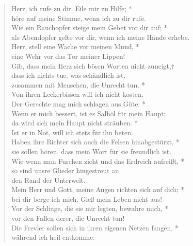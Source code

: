 \def\greinitialformat#1{{\fontsize{40}{40}\selectfont #1}}
\gresetfirstlineaboveinitial{\small \textcolor{red}{Ps 140(141)}}{}
\setaboveinitialseparation{0.72mm}


\vspace{0.3cm}

\begin{verse}
 Herr, ich rufe zu dir. Eile mir zu Hilfe; *\\
höre auf meine Stimme, wenn ich zu dir rufe.\\ \vin 
Wie ein Rauchopfer steige mein Gebet vor dir auf; *\\ \vin 
als Abendopfer gelte vor dir, wenn ich meine Hände erhebe.\\ 
Herr, stell eine Wache vor meinen Mund, *\\
eine Wehr vor das Tor meiner Lippen! \\ \vin 
Gib, dass mein Herz sich bösen Worten nicht zuneigt,†\\ \vin 
dass ich nichts tue, was schändlich ist, \\ \vin zusammen mit Menschen, die Unrecht tun. *\\ \vin  Von ihren Leckerbissen will ich nicht kosten.\\
Der Gerechte mag mich schlagen aus Güte: *\\
Wenn er mich bessert, ist es Salböl für mein Haupt; \\ \vin 
da wird sich mein Haupt nicht sträuben. *\\ \vin  Ist er in Not, will ich stets für ihn beten.\\
Haben ihre Richter sich auch die Felsen hinabgestürzt, *\\ 
sie sollen hören, dass mein Wort für sie freundlich ist.\\ \vin  
Wie wenn man Furchen zieht und das Erdreich aufreißt, *\\ \vin 
so sind unsre Glieder hingestreut an \\ \vin den Rand der Unterwelt.\\
Mein Herr und Gott, meine Augen richten sich auf dich; *\\
bei dir berge ich mich. Gieß mein Leben nicht aus! \\ \vin 
Vor der Schlinge, die sie mir legten, bewahre mich, *\\ \vin 
vor den Fallen derer, die Unrecht tun! \\
Die Frevler sollen sich in ihren eigenen Netzen fangen, *\\
während ich heil entkomme.\\ 



\end{verse}



